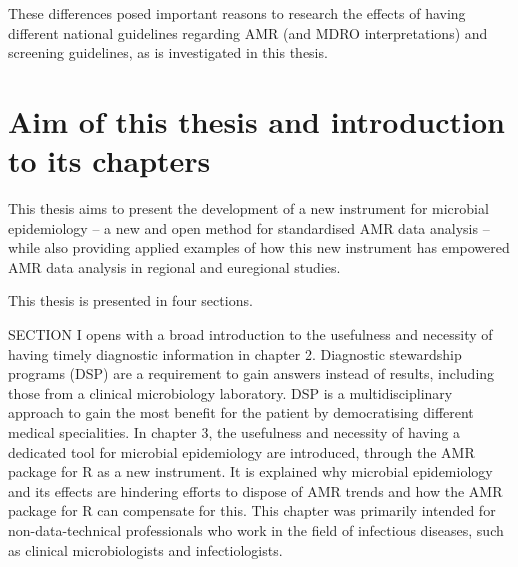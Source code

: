 \documentclass[
]{book}
\begin{document}
These differences posed important reasons to research the effects of having different national guidelines regarding AMR (and MDRO interpretations) and screening guidelines, as is investigated in this thesis.

\hypertarget{aim-of-this-thesis-and-introduction-to-its-chapters}{%
\section{Aim of this thesis and introduction to its chapters}\label{aim-of-this-thesis-and-introduction-to-its-chapters}}

This thesis aims to present the development of a new instrument for microbial epidemiology -- a new and open method for standardised AMR data analysis -- while also providing applied examples of how this new instrument has empowered AMR data analysis in regional and euregional studies.

This thesis is presented in four sections.

SECTION I opens with a broad introduction to the usefulness and necessity of having timely diagnostic information in chapter 2. Diagnostic stewardship programs (DSP) are a requirement to gain answers instead of results, including those from a clinical microbiology laboratory. DSP is a multidisciplinary approach to gain the most benefit for the patient by democratising different medical specialities. In chapter 3, the usefulness and necessity of having a dedicated tool for microbial epidemiology are introduced, through the AMR package for R as a new instrument. It is explained why microbial epidemiology and its effects are hindering efforts to dispose of AMR trends and how the AMR package for R can compensate for this. This chapter was primarily intended for non-data-technical professionals who work in the field of infectious diseases, such as clinical microbiologists and infectiologists.
\end{document}
